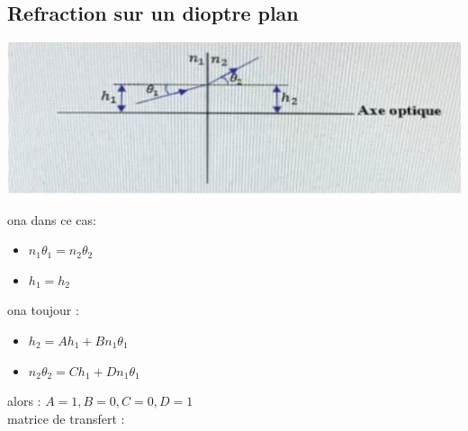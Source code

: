 \documentclass[12pt]{book}
\begin{document}
        \subsection{Refraction sur un dioptre plan}
            \begin{center}
                \includegraphics[width = 0.5\linewidth]{pic/dioptreplan.png}
            \end{center}
            \begin{center}
                \begin{minipage}{0.49\linewidth}
                    ona dans ce cas:
                    \begin{itemize}
                        \item $n_1\theta_1 = n_2\theta_2$
                        \item $h_1 = h_2$
                    \end{itemize}
                    
                \end{minipage}
                \begin{minipage}{0.49\linewidth}
                    ona toujour :
                    \begin{itemize}
                        \item $ h_2 = Ah_1 + Bn_1\theta_1$
                        \item $ n_2\theta_2 = Ch_1 + Dn_1\theta_1$
                    \end{itemize}
                    
                \end{minipage}
            \end{center}
            alors : $ A = 1 , B = 0 ,C = 0 , D = 1$ \\ 
            matrice de transfert : 
            \begin{center}
            \end{center}
            
\end{document}
